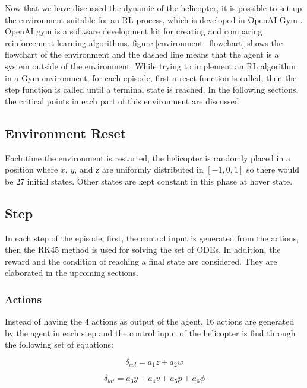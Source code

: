 Now that we have discussed the dynamic of the helicopter, it is possible to set up the environment suitable for an RL process, which is developed in OpenAI Gym \cite{brockman2016openai}. OpenAI gym is a software development kit for creating and comparing reinforcement learning algorithms. figure \ref{environment_flowchart} shows the flowchart of the environment and the dashed line means that the agent is a system outside of the environment. While trying to implement an RL algorithm in a Gym environment, for each episode, first a reset function is called, then the step function is called until a terminal state is reached. In the following sections, the critical points in each part of this environment are discussed. \\

\subsection{Environment Reset} \label{reset}

Each time the environment is restarted, the helicopter is randomly placed in a position where $x$, $y$, and z are uniformly distributed in $[-1,0,1]$ so there would be 27 initial states. Other states are kept constant in this phase at hover state.

\subsection{Step}
In each step of the episode, first, the control input is generated from the actions, then the RK45 method is used for solving the set of ODEs. In addition, the reward and the condition of reaching a final state are considered. They are elaborated in the upcoming sections.

\subsubsection{Actions}
Instead of having the 4 actions as output of the agent, 16 actions are generated by the agent in each step and the control input of the helicopter is find through the following set of equations:

\begin{equation}
	\delta_{col} = a_1 z + a_2 w 
\end{equation} 

\begin{equation}
	\delta_{lat} = a_3 y + a_4 v + a_5 p + a_6 \phi 
\end{equation}

